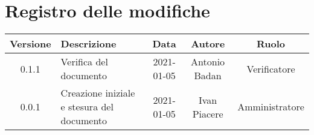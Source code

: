 \section*{Registro delle modifiche}

\begin{center}
	\begin{longtable}{|c|p{5cm}|c|c|c|}
	\hline
	\rowcolor{lighter-grayer}
	\textbf{Versione} & \textbf{Descrizione} & \textbf{Data} & \textbf{Autore} & \textbf{Ruolo} \\
	\hline
	\endfirsthead


	0.1.1 & Verifica del documento & 2021-01-05 & Antonio Badan & Verificatore \\
	\hline
	0.0.1 & Creazione iniziale e stesura del documento & 2021-01-05 & Ivan Piacere & Amministratore \\
	\hline
	\end{longtable}
\end{center}